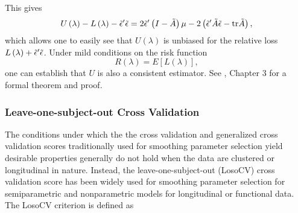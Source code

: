 \noindent
This gives
\begin{equation} 
U\left(\lambda\right) - L\left(\lambda\right) - \tilde{\epsilon}'\tilde{\epsilon}  =  2\tilde{\epsilon}' \left( I- \tilde{A}\right)\mu- 2\left( \tilde{\epsilon}'\tilde{A} \tilde{\epsilon} -  \mbox{tr}\tilde{A}\right), 
\end{equation}
 \noindent
 which allows one to easily see that $U\left(\lambda\right)$ is unbiased for the relative loss $L\left(\lambda\right) + \tilde{\epsilon}'\tilde{\epsilon}$.  Under mild conditions on the risk function
  \[
 R\left(\lambda\right) = E\left[L\left(\lambda\right)\right],
 \]
\noindent
one can establish that $U$ is also a consistent estimator. See \cite{gu2013smoothing}, Chapter 3 for a formal theorem and proof.


\subsubsection{Leave-one-subject-out Cross Validation}  
The conditions under which the the cross validation and generalized cross validation scores traditionally used for smoothing parameter selection yield desirable properties generally do not hold when the data are clustered or longitudinal in nature. Instead, the leave-one-subject-out (LosoCV) cross validation score has been widely used for smoothing parameter selection for semiparametric and nonparametric models for longitudinal or functional data. The LosoCV criterion is defined as

